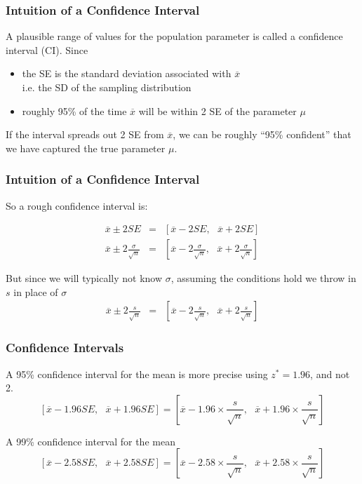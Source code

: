 \documentclass[handout]{beamer}
\newcommand{\blue}[1]{\textcolor{blue2}{#1}}
\newcommand{\xbar}{\overline{x}}
\begin{document}
\begin{frame}[fragile]
\frametitle{Intuition of a Confidence Interval}
A plausible range of values for the population parameter is called a \blue{confidence interval (CI)}.  Since
\begin{itemize}
\pause \item the SE is the standard deviation associated with $\xbar$\\
 i.e. the SD of the sampling distribution
\pause \item roughly 95\% of the time $\xbar$ will be within 2 SE of the parameter $\mu$
\end{itemize}

\pause If the interval spreads out 2 SE from $\xbar$, we can be roughly
\blue{``95\% confident''} that we have captured the true parameter $\mu$.  
\end{frame}


\begin{frame}[fragile]
\frametitle{Intuition of a Confidence Interval}
So a \blue{rough} confidence interval is:

\begin{eqnarray*}
\xbar \pm  2 SE &=& \left[\xbar - 2 SE, \mbox{  }\xbar + 2 SE\right]\\
\xbar \pm 2 \frac{\sigma}{\sqrt{n}} &=& \left[\xbar - 2 \frac{\sigma}{\sqrt{n}}, \mbox{  }\xbar + 2 \frac{\sigma}{\sqrt{n}}\right]
\end{eqnarray*}

\pause But since we will typically not know $\sigma$, assuming the conditions hold we throw in $s$ in place of $\sigma$
\begin{eqnarray*}
\xbar \pm 2 \frac{s}{\sqrt{n}} &=& \left[\xbar - 2 \frac{s}{\sqrt{n}}, \mbox{  }\xbar + 2 \frac{s}{\sqrt{n}}\right]
\end{eqnarray*}

\end{frame}


\begin{frame}
\frametitle{Confidence Intervals}

A 95\% confidence interval for the mean is more precise using $z^* = 1.96$, and not 2.  
\[
\left[\xbar - 1.96 SE, \mbox{  }\xbar + 1.96 SE\right] = 
\left[
\overline{x} - 1.96 \times\frac{s}{\sqrt n}, \mbox{  }
\overline{x} + 1.96 \times\frac{s}{\sqrt n}
\right]
\]


\pause A 99\% confidence interval for the mean
\[
\left[\xbar - 2.58 SE, \mbox{  }\xbar + 2.58 SE\right] = 
\left[
\overline{x} - 2.58 \times\frac{s}{\sqrt n}, \mbox{  }
\overline{x} + 2.58 \times\frac{s}{\sqrt n}
\right]
\]

\end{frame}
\end{document}
